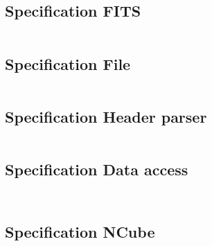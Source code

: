 \documentclass[a4paper,10pt]{article}
\begin{document}
\subsection{Specification FITS}
\inputminted{ada}{../lib/src/fits.ads}

\subsection{Specification File}
\inputminted{ada}{../lib/src/file.ads}

\subsection{Specification Header parser}
\inputminted{ada}{../lib/src/parser/strict.ads}

\subsection{Specification Data access}
\inputminted{ada}{../lib/src/data/generic_data_value.ads}
\inputminted{ada}{../lib/src/data/generic_data_unit.ads}

\subsection{Specification NCube}
\inputminted{ada}{../lib/src/ncube/ncube_funcs.ads}
\inputminted{ada}{../lib/src/ncube/ncube.ads}






\end{document}
